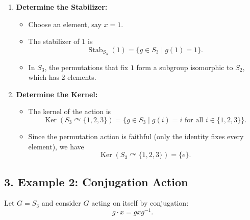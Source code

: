 \documentclass[12pt]{article}
\theoremstyle{definition} %
\theoremstyle{plain} %
\begin{document}
\begin{enumerate}[label=\textbf{Step \arabic*:}, leftmargin=*]
    \item \textbf{Determine the Stabilizer:}
    \begin{itemize}
        \item Choose an element, say \(x=1\).
        \item The stabilizer of \(1\) is
        \[
        \operatorname{Stab}_{S_3}(1) = \{g \in S_3 \mid g(1)=1\}.
        \]
        \item In \(S_3\), the permutations that fix \(1\) form a subgroup isomorphic to \(S_2\), which has 2 elements.
    \end{itemize}
    
    \item \textbf{Determine the Kernel:}
    \begin{itemize}
        \item The kernel of the action is
        \[
        \operatorname{Ker}(S_3\curvearrowright \{1,2,3\}) = \{g\in S_3 \mid g(i)=i \text{ for all } i\in \{1,2,3\}\}.
        \]
        \item Since the permutation action is faithful (only the identity fixes every element), we have
        \[
        \operatorname{Ker}(S_3\curvearrowright \{1,2,3\}) = \{e\}.
        \]
    \end{itemize}
\end{enumerate}

\subsection*{3. Example 2: Conjugation Action}
Let \(G = S_3\) and consider \(G\) acting on itself by conjugation:
\[
g \cdot x = gxg^{-1}.
\]
\end{document}
